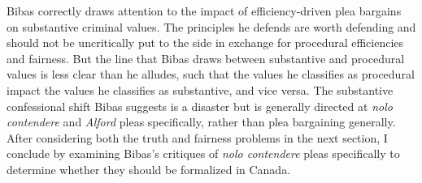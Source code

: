 Bibas correctly draws attention to the impact of efficiency-driven plea bargains on substantive criminal values. The principles he defends are worth defending and should not be uncritically put to the side in exchange for procedural efficiencies and fairness. But the line that Bibas draws between substantive and procedural values is less clear than he alludes, such that the values he classifies as procedural impact the values he classifies as substantive, and vice versa. The substantive confessional shift Bibas suggests is a disaster but is generally directed at \textit{nolo contendere} and \textit{Alford} pleas specifically, rather than plea bargaining generally. After considering both the truth and fairness problems in the next section, I conclude by examining Bibas's critiques of \textit{nolo contendere} pleas specifically to determine whether they should be formalized in Canada.